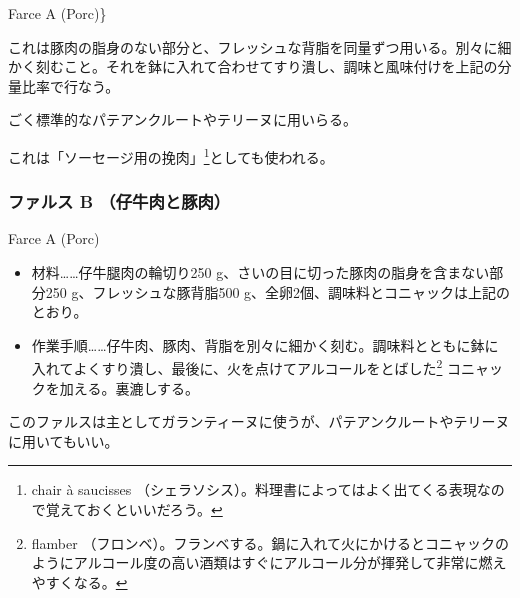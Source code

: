 \begin{recette}
\begin{frsubenv}

Farce A (Porc)\}

\end{frsubenv}


これは豚肉の脂身のない部分と、フレッシュな背脂を同量ずつ用いる。別々に細かく刻むこと。それを鉢に入れて合わせてすり潰し、調味と風味付けを上記の分量比率で行なう。

ごく標準的なパテアンクルートやテリーヌに用いらる。

これは「\protect\hypertarget{chair-a-saucisse}{ソーセージ用の挽肉}」\footnote{chair
  à saucisses
  （シェラソシス）。料理書によってはよく出てくる表現なので覚えておくといいだろう。}としても使われる。\label{chair-a-saucisse}

\atoaki{}

\hypertarget{farce-froide-b}{%
\subsubsection{ファルス B （仔牛肉と豚肉）}\label{farce-froide-b}}

\begin{frsubenv}

Farce A (Porc)

\end{frsubenv}


\begin{itemize}
\item
  材料\ldots{}\ldots{}仔牛腿肉の輪切り250
  g、さいの目に切った豚肉の脂身を含まない部分250
  g、フレッシュな豚背脂500
  g、全卵2個、調味料とコニャックは上記のとおり。
\item
  作業手順\ldots{}\ldots{}仔牛肉、豚肉、背脂を別々に細かく刻む。調味料とともに鉢に入れてよくすり潰し、最後に、火を点けてアルコールをとばした\footnote{flamber
    （フロンベ）。フランベする。鍋に入れて火にかけるとコニャックのようにアルコール度の高い酒類はすぐにアルコール分が揮発して非常に燃えやすくなる。}
  コニャックを加える。裏漉しする。
\end{itemize}

このファルスは主としてガランティーヌに使うが、パテアンクルートやテリーヌに用いてもいい。


\end{recette}
